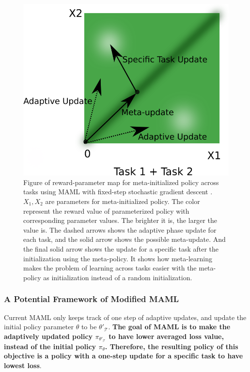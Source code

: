 \documentclass{article}
\begin{document}
\begin{figure}[htbp]
	\centering
	\includegraphics[scale=0.3]{img/understand3.png}
	\caption{Figure of reward-parameter map for meta-initialized policy across tasks using MAML with fixed-step stochastic gradient descent . $X_1, X_2$ are parameters for meta-initialized policy. The color represent the reward value of parameterized policy with corresponding parameter values. The brighter it is, the larger the value is. The dashed arrows shows the adaptive phase update for each task, and the solid arrow shows the possible meta-update. And the final solid arrow shows the update for a specific task after the initialization using the meta-policy. It shows how meta-learning makes the problem of learning across tasks easier with the meta-policy as initialization instead of a random initialization.}
	\label{fig:understand3}
\end{figure}

\subsubsection{A Potential Framework of Modified MAML}

Current MAML only keeps track of one step of adaptive updates, and update the initial policy parameter $\theta$ to be $\theta'_\mathcal{T}$. \textbf{The goal of MAML is to make the adaptively updated policy $\pi_{\theta'_\mathcal{T}}$ to have lower averaged loss value, instead of the initial policy $\pi_{\theta}$. Therefore, the resulting policy of this objective is a policy with a one-step update for a specific task to have lowest loss}. 
\end{document}

